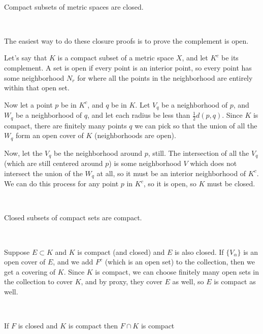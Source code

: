 \documentclass{article}
\begin{document}
\begin{theorem}
\

Compact subsets of metric spaces are closed.
\end{theorem}

\begin{customproof}
\

The easiest way to do these closure proofs is to prove the complement is open.

Let's say that $K$ is a compact subset of a metric space $X$, and let $K^c$ be its complement. A set is open if every point is an interior point, so every point has some neighborhood $N_r$ for where all the points in the neighborhood are entirely within that open set.

Now let a point $p$ be in $K^c$, and $q$ be in $K$. Let $V_q$ be a neighborhood of $p$, and $W_q$ be a neighborhood of $q$, and let each radius be less than $\frac{1}{2}d(p,q)$. Since $K$ is compact, there are finitely many points $q$ we can pick so that the union of all the $W_q$ form an open cover of $K$ (neighborhoods are open). 

Now, let the $V_q$ be the neighborhood around $p$, still. The intersection of all the $V_q$ (which are still centered around $p$) is some neighborhood $V$ which does not intersect the union of the $W_q$ at all, so it must be an interior neighborhood of $K^c$. We can do this process for any point $p$ in $K^c$, so it is open, so $K$ must be closed.
\end{customproof}

\begin{theorem}
\

Closed subsets of compact sets are compact.
\end{theorem}

\begin{customproof}
\

Suppose $E \subset K$ and $K$ is compact (and closed) and $E$ is also closed. If $\{V_\alpha\}$ is an open cover of $E$, and we add $F^c$ (which is an open set) to the collection, then we get a covering of $K$. Since $K$ is compact, we can choose finitely many open sets in the collection to cover $K$, and by proxy, they cover $E$ as well, so $E$ is compact as well.
\end{customproof}

\begin{corollary}
\

If $F$ is closed and $K$ is compact then $F \cap K$ is compact
\end{corollary}
\end{document}
